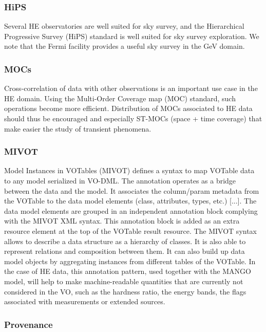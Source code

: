 \documentclass[11pt,a4paper]{ivoa}
\begin{document}
\subsubsection{HiPS}

Several HE observatories are well suited for sky survey, and the Hierarchical Progressive Survey (HiPS) standard is well suited for sky survey exploration. We note that the Fermi facility provides a useful sky survey in the GeV domain.


\subsubsection{MOCs}

Cross-correlation of data with other observations is an important use case in the HE domain. Using the Multi-Order Coverage map (MOC) standard, such operations become more efficient. Distribution of MOCs associated to HE data should thus be encouraged and especially ST-MOCs (space + time coverage)
that make easier the study of transient phenomena.

\subsubsection{MIVOT}

Model Instances in VOTables (MIVOT) defines a syntax to map VOTable data to any model serialized in VO-DML. The annotation operates as a bridge between the data and the model. It associates the column/param metadata from the VOTable to the data model elements (class, attributes, types, etc.) [...]. The data model elements are grouped in an independent annotation block complying with the MIVOT XML syntax. This annotation block is added as an extra resource element at the top of the VOTable result resource. The MIVOT syntax allows to describe a data structure as a hierarchy of classes. It is also able to represent relations and composition between them. It can also build up data model objects by aggregating instances from different tables of the VOTable.
In the case of HE data, this annotation pattern, used together with the MANGO model, will help to make machine-readable quantities that are currently not considered in the VO, such as the hardness ratio, the energy bands, the flags associated with measurements or  extended sources.




\subsubsection{Provenance}
\end{document}
